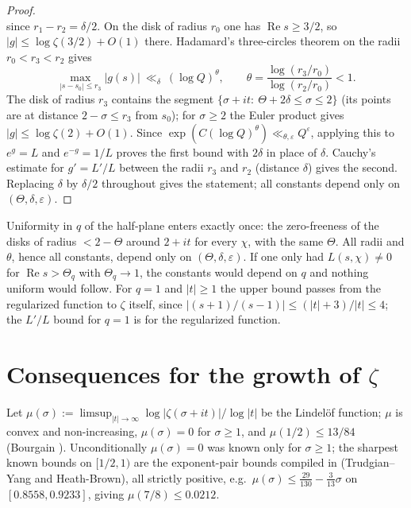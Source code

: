 \documentclass[11pt]{article}
\renewcommand{\Re}{\operatorname{Re}}
\begin{document}
\begin{proof}
\[\]
since $r_1-r_2=\delta/2$. On the disk of radius $r_0$ one has $\Re s\ge3/2$, so $|g|\le\log\zeta(3/2)+O(1)$ there. Hadamard's three-circles theorem on the radii $r_0<r_3<r_2$ gives
\[
\max_{|s-s_0|\le r_3}|g(s)|\ \ll_\delta\ (\log Q)^{\theta},\qquad \theta=\frac{\log(r_3/r_0)}{\log(r_2/r_0)}<1 .
\]
The disk of radius $r_3$ contains the segment $\{\sigma+it:\ \Theta+2\delta\le\sigma\le2\}$ (its points are at distance $2-\sigma\le r_3$ from $s_0$); for $\sigma\ge2$ the Euler product gives $|g|\le\log\zeta(2)+O(1)$. Since $\exp(C(\log Q)^{\theta})\ll_{\theta,\varepsilon}Q^{\varepsilon}$, applying this to $e^{g}=L$ and $e^{-g}=1/L$ proves the first bound with $2\delta$ in place of $\delta$. Cauchy's estimate for $g'=L'/L$ between the radii $r_3$ and $r_2$ (distance $\delta$) gives the second. Replacing $\delta$ by $\delta/2$ throughout gives the statement; all constants depend only on $(\Theta,\delta,\varepsilon)$.
\end{proof}

Uniformity in $q$ of the half-plane enters exactly once: the zero-freeness of the disks of radius $<2-\Theta$ around $2+it$ for every $\chi$, with the same $\Theta$. All radii and $\theta$, hence all constants, depend only on $(\Theta,\delta,\varepsilon)$. If one only had $L(s,\chi)\ne0$ for $\Re s>\Theta_q$ with $\Theta_q\to1$, the constants would depend on $q$ and nothing uniform would follow. For $q=1$ and $|t|\ge1$ the upper bound passes from the regularized function to $\zeta$ itself, since $|(s+1)/(s-1)|\le(|t|+3)/|t|\le4$; the $L'/L$ bound for $q=1$ is for the regularized function.

\section{Consequences for the growth of $\zeta$}

Let $\mu(\sigma):=\limsup_{|t|\to\infty}\log|\zeta(\sigma+it)|/\log|t|$ be the Lindel\"of function; $\mu$ is convex and non-increasing, $\mu(\sigma)=0$ for $\sigma\ge1$, and $\mu(1/2)\le13/84$ (Bourgain \cite{Bou17}). Unconditionally $\mu(\sigma)=0$ was known only for $\sigma\ge1$; the sharpest known bounds on $[1/2,1)$ are the exponent-pair bounds compiled in \cite[Table~6.2]{ANTEDB} (Trudgian--Yang \cite{TY24} and Heath-Brown), all strictly positive, e.g.\ $\mu(\sigma)\le\tfrac{29}{130}-\tfrac{3}{13}\sigma$ on $[0.8558,0.9233]$, giving $\mu(7/8)\le0.0212$.
\end{document}
